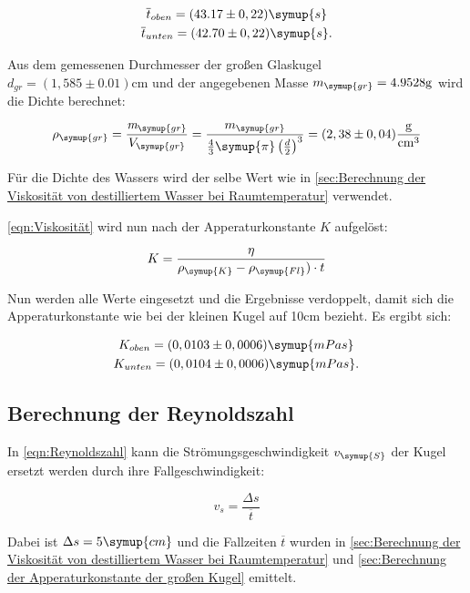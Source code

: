 \begin{gather}
  \overline{t}_{oben} = (43.17\pm0,22) \symup{s} \notag \\
  \overline{t}_{unten} = (42.70\pm0,22) \symup{s}  \notag .
\end{gather}

Aus dem gemessenen Durchmesser der großen Glaskugel $d_{gr}=(1,585\pm0.01) \unit{\centi\metre}$ und der angegebenen Masse
$m_{\symup{gr}}=4.9528\unit{\gram}$ wird die Dichte berechnet:

\begin{equation}
  \rho_{\symup{gr}}=\frac{\emph{m}_{\symup{gr}}}{V_{\symup{gr}}}=%
  \frac{m_{\symup{gr}}}{\frac{4}{3}\symup{\pi}\left(\frac{d}{2}\right)^3}=(2,38\pm0,04) \unit{\gram\per\cubic\centi\metre}
\end{equation}

Für die Dichte des Wassers wird der selbe Wert wie in \autoref{sec:Berechnung der Viskosität von destilliertem Wasser bei Raumtemperatur}
verwendet.

\autoref{eqn:Viskosität} wird nun nach der Apperaturkonstante $K$ aufgelöst:

\begin{equation}
  K=\frac{\eta}{\rho_{\symup{K}}-\rho_{\symup{Fl}})\cdot t}
\end{equation}

Nun werden alle Werte eingesetzt und die Ergebnisse verdoppelt, damit sich die Apperaturkonstante wie bei der kleinen
Kugel auf 10cm bezieht. Es ergibt sich:

\begin{gather}
  K_{oben} = (0,0103\pm0,0006) \symup{mPas}  \notag \\
  K_{unten} = (0,0104\pm0,0006) \symup{mPas}  \notag .
\end{gather}

\subsection{Berechnung der Reynoldszahl}
\label{sec:Berechnung der Reynoldszahl}

In \autoref{eqn:Reynoldszahl} kann die Strömungsgeschwindigkeit $v_{\symup{S}}$ der  Kugel ersetzt werden durch
ihre Fallgeschwindigkeit:

\begin{equation}
  v_{s}=\frac{\Delta s}{\overline{t}}
\end{equation}

Dabei ist $\Delta s=5\symup{cm}$ und die Fallzeiten $\overline{t}$ wurden in
\autoref{sec:Berechnung der Viskosität von destilliertem Wasser bei Raumtemperatur} und
\autoref{sec:Berechnung der Apperaturkonstante der großen Kugel} emittelt.

